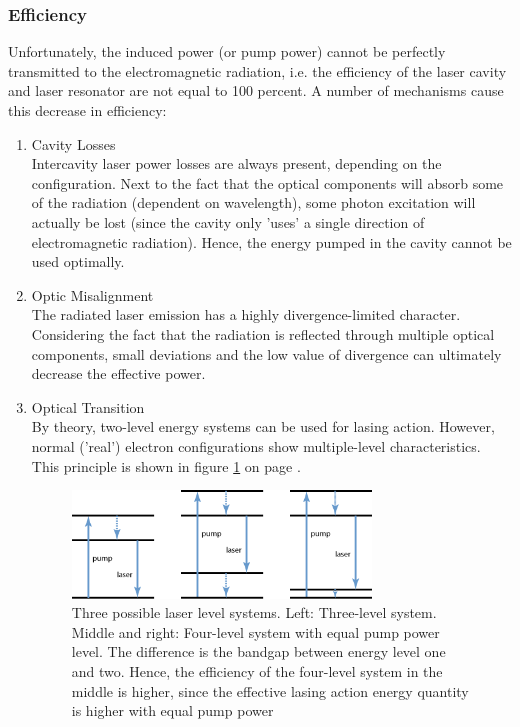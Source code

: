 	\subsubsection{Efficiency}
Unfortunately, the induced power (or pump power) cannot be perfectly transmitted to the electromagnetic radiation, i.e. the efficiency of the \acs{laser} cavity and \acs{laser} resonator are not equal to 100 percent. A number of mechanisms cause this decrease in efficiency:
	\begin{enumerate}
		\item{Cavity Losses}\\
Intercavity \acs{laser} power losses are always present, depending on the configuration. Next to the fact that the optical components will absorb some of the radiation (dependent on wavelength), some photon excitation will actually be lost (since the cavity only 'uses' a single direction of electromagnetic radiation). Hence, the energy pumped in the cavity cannot be used optimally. 
		\item{Optic Misalignment}\\
The radiated \acs{laser} emission has a highly divergence-limited character. Considering the fact that the radiation is reflected through multiple optical components, small deviations and the low value of divergence can ultimately decrease the effective power.
		\item{Optical Transition}\\
By theory, two-level energy systems can be used for lasing action. However, normal ('real') electron configurations show multiple-level characteristics. This principle is shown in figure \ref{fig:4_level_system} on page \pageref{fig:4_level_system}.

\begin{figure}[ht!]
\centering
\includegraphics[width=0.75\textwidth]{chapters/img/4_level_system.png}
\caption{Three possible laser level systems. Left: Three-level system. Middle and right: Four-level system with equal pump power level. The difference is the bandgap between energy level one and two. Hence, the efficiency of the four-level system in the middle is higher, since the effective lasing action energy quantity is higher with equal pump power}
\label{fig:4_level_system}
\end{figure}
  
	\end{enumerate} 


